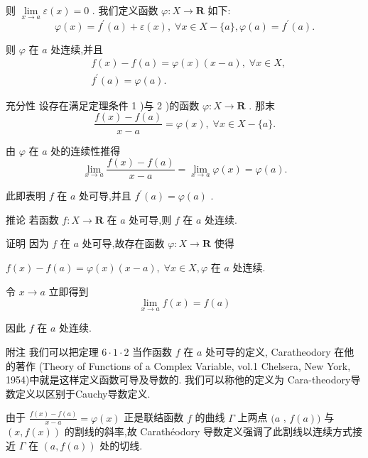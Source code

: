 则 $\mathop{\lim }\limits_{{x \rightarrow  a}}\varepsilon \left( x\right)  = 0$ . 我们定义函数 $\varphi  : X \rightarrow  \mathbf{R}$ 如下:
$$\varphi \left( x\right)  = {f}^{\prime }\left( a\right)  + \varepsilon \left( x\right) ,\;\forall x \in  X - \{ a\} ,\varphi \left( a\right)  = {f}^{\prime }\left( a\right) .$$

则 $\varphi$ 在 $a$ 处连续,并且
\begin{align*}
	&f\left( x\right)  - f\left( a\right)  = \varphi \left( x\right) \left( {x - a}\right) ,\;\forall x \in  X,\\
	&{f}^{\prime }\left( a\right)  = \varphi \left( a\right) .
\end{align*}

充分性 设存在满足定理条件 1 )与 2 )的函数 $\varphi  : X \rightarrow  \mathbf{R}$ . 那末
$$\frac{f\left( x\right)  - f\left( a\right) }{x - a} = \varphi \left( x\right) ,\;\forall x \in  X - \{ a\} .$$

由 $\varphi$ 在 $a$ 处的连续性推得
$$\mathop{\lim }\limits_{{x \rightarrow  a}}\frac{f\left( x\right)  - f\left( a\right) }{x - a} = \mathop{\lim }\limits_{{x \rightarrow  a}}\varphi \left( x\right)  = \varphi \left( a\right) .$$

此即表明 $f$ 在 $a$ 处可导,并且 ${f}^{\prime }\left( a\right)  = \varphi \left( a\right)$ .

推论 若函数 $f : X \rightarrow  \mathbf{R}$ 在 $a$ 处可导,则 $f$ 在 $a$ 处连续.

证明 因为 $f$ 在 $a$ 处可导,故存在函数 $\varphi  : X \rightarrow  \mathbf{R}$ 使得

$f\left( x\right)  - f\left( a\right)  = \varphi \left( x\right) \left( {x - a}\right) ,\;\forall x \in  X,\varphi$ 在 $a$ 处连续.

令 $x \rightarrow  a$ 立即得到
$$\mathop{\lim }\limits_{{x \rightarrow  a}}f\left( x\right)  = f\left( a\right)$$

因此 $f$ 在 $a$ 处连续.

附注 我们可以把定理 $6 \cdot  1 \cdot  2$ 当作函数 $f$ 在 $a$ 处可导的定义, Caratheodory 在他的著作 (Theory of Functions of a Complex Variable, vol.1 Chelsera, New York, 1954)中就是这样定义函数可导及导数的. 我们可以称他的定义为 Cara-theodory导数定义以区别于Cauchy导数定义.

由于 $\frac{f\left( x\right)  - f\left( a\right) }{x - a} = \varphi \left( x\right)$ 正是联结函数 $f$ 的曲线 $\Gamma$ 上两点 $(a$ , $f\left( a\right) )$ 与 $\left( {x,f\left( x\right) }\right)$ 的割线的斜率,故 Carathéodory 导数定义强调了此割线以连续方式接近 $\Gamma$ 在 $\left( {a,f\left( a\right) }\right)$ 处的切线.

